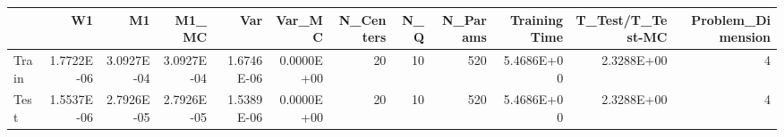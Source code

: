 \begin{tabular}{lrrrrrrrrrrr}
\toprule
{} &         W1 &         M1 &      M1\_MC &        Var &     Var\_MC &  N\_Centers &  N\_Q &  N\_Params &  Training Time &  T\_Test/T\_Test-MC &  Problem\_Dimension \\
\midrule
Train & 1.7722E-06 & 3.0927E-04 & 3.0927E-04 & 1.6746E-06 & 0.0000E+00 &         20 &   10 &       520 &     5.4686E+00 &        2.3288E+00 &                  4 \\
Test  & 1.5537E-06 & 2.7926E-05 & 2.7926E-05 & 1.5389E-06 & 0.0000E+00 &         20 &   10 &       520 &     5.4686E+00 &        2.3288E+00 &                  4 \\
\bottomrule
\end{tabular}
